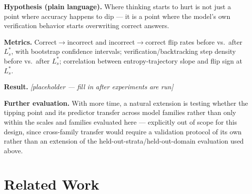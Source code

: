 \documentclass[11pt]{article}
\newcommand{\ph}{\textit{[placeholder --- fill in after experiments are run]}}
\begin{document}
\textbf{Hypothesis (plain language).} Where thinking starts to hurt is not just a point where accuracy happens to dip --- it is a point where the model's own verification behavior starts overwriting correct answers.

\textbf{Metrics.} Correct$\to$incorrect and incorrect$\to$correct flip rates before vs.\ after $L^*_s$, with bootstrap confidence intervals; verification/backtracking step density before vs.\ after $L^*_s$; correlation between entropy-trajectory slope and flip sign at $L^*_s$.

\textbf{Result.} \ph

\vspace{0.5em}
\noindent\textbf{Further evaluation.} With more time, a natural extension is testing whether the tipping point and its predictor transfer across model families rather than only within the scales and families evaluated here --- explicitly out of scope for this design, since cross-family transfer would require a validation protocol of its own rather than an extension of the held-out-strata/held-out-domain evaluation used above.

\section{Related Work}
\end{document}

